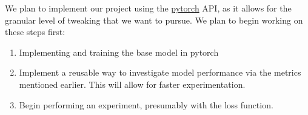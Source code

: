 \documentclass{article}
\begin{document}
We plan to implement our project using the \href{https://pytorch.org/}{pytorch} API, as it allows for the granular level of tweaking that we want to pursue. We plan to begin working on these steps first:
\begin{enumerate}
	\item Implementing and training the base model in pytorch
	\item Implement a reusable way to investigate model performance via the metrics mentioned earlier. This will allow for faster experimentation.
	\item Begin performing an experiment, presumably with the loss function. 
\end{enumerate}



\end{document}
